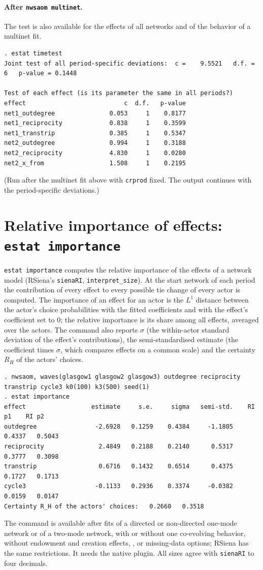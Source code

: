\paragraph{After \texttt{nwsaom multinet}.} The test is also available for the effects of all networks and of the behavior of a multinet fit.
\begin{lstlisting}
. estat timetest
Joint test of all period-specific deviations:  c =    9.5521   d.f. = 6   p-value = 0.1448

Test of each effect (is its parameter the same in all periods?)
effect                           c  d.f.   p-value
net1_outdegree               0.053     1    0.8177
net1_reciprocity             0.838     1    0.3599
net1_transtrip               0.385     1    0.5347
net2_outdegree               0.994     1    0.3188
net2_reciprocity             4.830     1    0.0280
net2_x_from                  1.508     1    0.2195
\end{lstlisting}
(Run after the multinet fit above with \texttt{crprod} fixed. The output continues with the period-specific deviations.)

\section{Relative importance of effects: \texttt{estat importance}}

\texttt{estat importance} computes the relative importance of the effects of a network model (RSiena's \texttt{sienaRI}, \texttt{interpret\_size}). At the start network of each period the contribution of every effect to every possible tie change of every actor is computed. The importance of an effect for an actor is the $L^1$ distance between the actor's choice probabilities with the fitted coefficients and with the effect's coefficient set to 0; the relative importance is its share among all effects, averaged over the actors. The command also reports $\sigma$ (the within-actor standard deviation of the effect's contributions), the semi-standardised estimate (the coefficient times $\sigma$, which compares effects on a common scale) and the certainty $R_H$ of the actors' choices.
\begin{lstlisting}
. nwsaom, waves(glasgow1 glasgow2 glasgow3) outdegree reciprocity transtrip cycle3 k0(100) k3(500) seed(1)
. estat importance
effect                  estimate     s.e.     sigma   semi-std.    RI p1    RI p2
outdegree                -2.6928   0.1259    0.4384     -1.1805   0.4337   0.5043
reciprocity               2.4849   0.2188    0.2140      0.5317   0.3777   0.3098
transtrip                 0.6716   0.1432    0.6514      0.4375   0.1727   0.1713
cycle3                   -0.1133   0.2936    0.3374     -0.0382   0.0159   0.0147
Certainty R_H of the actors' choices:   0.2660   0.3518
\end{lstlisting}
The command is available after fits of a directed or non-directed one-mode network or of a two-mode network, with or without one co-evolving behavior, without endowment and creation effects, ,  or missing-data options; RSiena has the same restrictions. It needs the native plugin. All sizes agree with \texttt{sienaRI} to four decimals.

